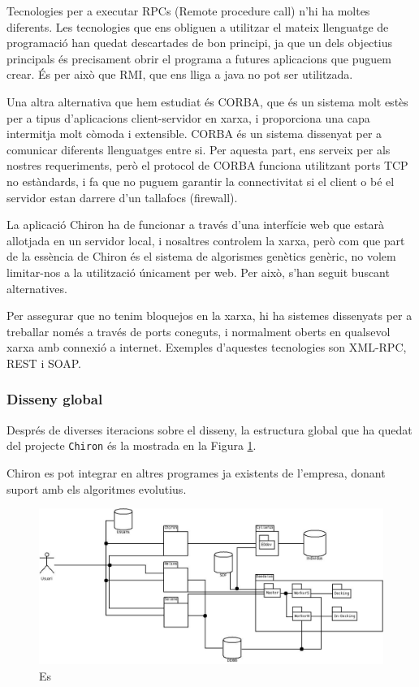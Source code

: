 Tecnologies per a executar RPCs (Remote procedure call) n'hi ha moltes
diferents. Les tecnologies que ens obliguen a utilitzar el mateix llenguatge de
programació han quedat descartades de bon principi, ja que un dels objectius
principals és precisament obrir el programa a futures aplicacions que puguem
crear.  És per això que RMI, que ens lliga a java no pot ser utilitzada.  

Una altra alternativa que hem estudiat és CORBA, que és un sistema molt estès
per a tipus d'aplicacions client-servidor en xarxa, i proporciona una capa
intermitja molt còmoda i extensible.  CORBA és un sistema dissenyat per a
comunicar diferents llenguatges entre si.  Per aquesta part, ens serveix per als
nostres requeriments, però el protocol de CORBA funciona utilitzant ports TCP
no estàndards, i fa que no puguem garantir la connectivitat si el client o bé el
servidor estan darrere d'un tallafocs (firewall).

La aplicació Chiron ha de funcionar a través d'una interfície web que estarà
allotjada en un servidor local, i nosaltres controlem la xarxa, però com que
part de la essència de Chiron és el sistema de algorismes genètics genèric, no
volem limitar-nos a la utilització únicament per web.  Per això, s'han seguit
buscant alternatives.

Per assegurar que no tenim bloquejos en la xarxa, hi ha sistemes dissenyats per a
treballar només a través de ports coneguts, i normalment oberts en qualsevol
xarxa amb connexió a internet.  Exemples d'aquestes tecnologies son XML-RPC, REST
i SOAP.

\subsubsection{Disseny global} %
\label{ssub:Diseny global}

Després de diverses iteracions sobre el disseny, la estructura global que ha
quedat del projecte \texttt{Chiron} és la mostrada en la Figura \ref{fig:disenyChiron}.

Chiron es pot integrar en altres programes ja existents de l'empresa, donant
suport amb els algoritmes evolutius.  

\begin{figure}[h]
	\begin{center}
		\includegraphics[scale=0.4]{chiron/arquitectura_global_chiron.jpg}
	\end{center}
	\caption{Es}
	\label{fig:disenyChiron}
\end{figure}

